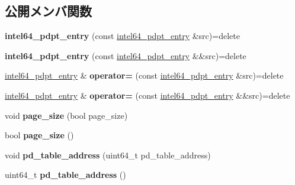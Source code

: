 \subsection*{公開メンバ関数}
\begin{DoxyCompactItemize}
\item 
\hypertarget{classintel64__pdpt__entry_aa8a51fe2f1c551dd8a545aa7aa07374c}{}{\bfseries intel64\+\_\+pdpt\+\_\+entry} (const \hyperlink{classintel64__pdpt__entry}{intel64\+\_\+pdpt\+\_\+entry} \&src)=delete\label{classintel64__pdpt__entry_aa8a51fe2f1c551dd8a545aa7aa07374c}

\item 
\hypertarget{classintel64__pdpt__entry_a9385e9a2093e34b07499173da97ac2f6}{}{\bfseries intel64\+\_\+pdpt\+\_\+entry} (const \hyperlink{classintel64__pdpt__entry}{intel64\+\_\+pdpt\+\_\+entry} \&\&src)=delete\label{classintel64__pdpt__entry_a9385e9a2093e34b07499173da97ac2f6}

\item 
\hypertarget{classintel64__pdpt__entry_aadd1bbb0bbd4a6d4b12e6a5303c0da0c}{}\hyperlink{classintel64__pdpt__entry}{intel64\+\_\+pdpt\+\_\+entry} \& {\bfseries operator=} (const \hyperlink{classintel64__pdpt__entry}{intel64\+\_\+pdpt\+\_\+entry} \&src)=delete\label{classintel64__pdpt__entry_aadd1bbb0bbd4a6d4b12e6a5303c0da0c}

\item 
\hypertarget{classintel64__pdpt__entry_a7a41c3ce7324028364eca0871db3d505}{}\hyperlink{classintel64__pdpt__entry}{intel64\+\_\+pdpt\+\_\+entry} \& {\bfseries operator=} (const \hyperlink{classintel64__pdpt__entry}{intel64\+\_\+pdpt\+\_\+entry} \&\&src)=delete\label{classintel64__pdpt__entry_a7a41c3ce7324028364eca0871db3d505}

\item 
\hypertarget{classintel64__pdpt__entry_a9a48fbdce2a03fb64760fa2287dd425e}{}void {\bfseries page\+\_\+size} (bool page\+\_\+size)\label{classintel64__pdpt__entry_a9a48fbdce2a03fb64760fa2287dd425e}

\item 
\hypertarget{classintel64__pdpt__entry_a4bb98ce432caf83c8aab9d1f8e854e33}{}bool {\bfseries page\+\_\+size} ()\label{classintel64__pdpt__entry_a4bb98ce432caf83c8aab9d1f8e854e33}

\item 
\hypertarget{classintel64__pdpt__entry_ad0f35f360bcdc337026d7483775145e5}{}void {\bfseries pd\+\_\+table\+\_\+address} (uint64\+\_\+t pd\+\_\+table\+\_\+address)\label{classintel64__pdpt__entry_ad0f35f360bcdc337026d7483775145e5}

\item 
\hypertarget{classintel64__pdpt__entry_ab707b8733d73c9dd77d7839780a09cd0}{}uint64\+\_\+t {\bfseries pd\+\_\+table\+\_\+address} ()\label{classintel64__pdpt__entry_ab707b8733d73c9dd77d7839780a09cd0}

\end{DoxyCompactItemize}
